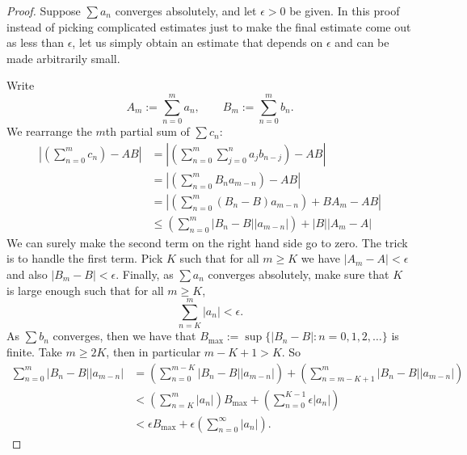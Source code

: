 \documentclass[12pt]{book}
\newcommand{\abs}[1]{\left\lvert {#1} \right\rvert}
\theoremstyle{plain}
\theoremstyle{remark}
\theoremstyle{definition}
\theoremstyle{exercise}
\theoremstyle{example}
\begin{document}
\begin{proof}
Suppose $\sum a_n$ converges absolutely, and let $\epsilon > 0$ be
given.
In this proof instead of picking complicated estimates just to make
the final estimate come out as less than $\epsilon$,
let us simply obtain an estimate that depends on $\epsilon$
and can be made arbitrarily small.

Write
\begin{equation*}
A_m := \sum_{n=0}^m a_n , \qquad B_m := \sum_{n=0}^m b_n .
\end{equation*}
We rearrange the $m$th partial sum of $\sum c_n$:
\begin{equation*}
\begin{split}
\abs{\left(\sum_{n=0}^m c_n \right) - AB}
& =
\abs{\left( \sum_{n=0}^m \sum_{j=0}^n a_j b_{n-j} \right) - AB}
\\
& =
\abs{\left( \sum_{n=0}^m
  B_n a_{m-n} \right) - AB}
\\
& =
\abs{\left( \sum_{n=0}^m
  ( B_n -  B ) a_{m-n} \right)
    + B A_m - AB}
\\
& \leq
\left(
\sum_{n=0}^m
  \abs{ B_n -  B } \abs{a_{m-n}}
\right)
+
\abs{B}\abs{A_m - A}
\end{split}
\end{equation*}
We can surely make the second term on the right hand side go to zero.
The trick is to handle the first term.
Pick $K$ such that for all $m \geq K$ we have 
$\abs{A_m - A} < \epsilon$ and
also
$\abs{B_m - B} < \epsilon$.  Finally,
as $\sum a_n$ converges absolutely,
make sure that $K$ is large enough such that
for all $m \geq K$,
\begin{equation*}
\sum_{n=K}^m \abs{a_n} < \epsilon .
\end{equation*}
As $\sum b_n$ converges, then
we have that
$B_{\text{max}} := \sup \{ \abs{ B_n - B } : n = 0,1,2,\ldots \}$
is finite.  Take $m \geq 2K$, then in particular $m-K+1 > K$.  So
\begin{equation*}
\begin{split}
\sum_{n=0}^m
  \abs{ B_n -  B } \abs{a_{m-n}}
& =
\left(
\sum_{n=0}^{m-K}
  \abs{ B_n -  B } \abs{a_{m-n}}
\right)
+
\left(
\sum_{n=m-K+1}^m
  \abs{ B_n -  B } \abs{a_{m-n}}
\right)
\\
& <
\left(
\sum_{n=K}^m
\abs{a_{n}}
\right)
B_{\text{max}}
+
\left(
\sum_{n=0}^{K-1}
  \epsilon \abs{a_{n}}
\right)
\\
& <
\epsilon
B_{\text{max}}
+
\epsilon
\left(
\sum_{n=0}^\infty \abs{a_{n}}
\right) .
\end{split}
\end{equation*}

\end{proof}
\end{document}
